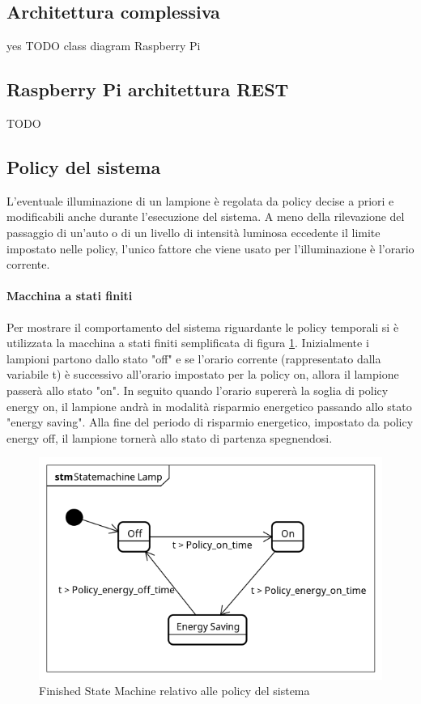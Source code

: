 \subsection{Architettura complessiva}
yes
TODO class diagram Raspberry Pi

\subsection{Raspberry Pi architettura REST}
TODO

\subsection{Policy del sistema}
L'eventuale illuminazione di un lampione è regolata da policy decise a priori e modificabili anche durante l'esecuzione del sistema.
A meno della rilevazione del passaggio di un'auto o di un livello di intensità luminosa eccedente il limite impostato nelle policy, l'unico fattore che viene usato per l'illuminazione è l'orario corrente.
\paragraph{Macchina a stati finiti}
Per mostrare il comportamento del sistema riguardante le policy temporali si è utilizzata la macchina a stati finiti semplificata di figura \ref{FSM POLICY}.
Inizialmente i lampioni partono dallo stato "off" e se l'orario corrente (rappresentato dalla variabile t) è successivo all'orario impostato per la policy on, allora il lampione passerà allo stato "on". In seguito quando l'orario supererà la soglia di policy energy on, il lampione andrà in modalità risparmio energetico passando allo stato "energy saving".
Alla fine del periodo di risparmio energetico, impostato da policy energy off, il lampione tornerà allo stato di partenza spegnendosi.
\begin{figure}[ht]
	\centering
	\includegraphics[scale=.8]{figure/Statemachine_Lamp.png}
	\caption{Finished State Machine relativo alle policy del sistema \label{FSM POLICY}}
\end{figure}

